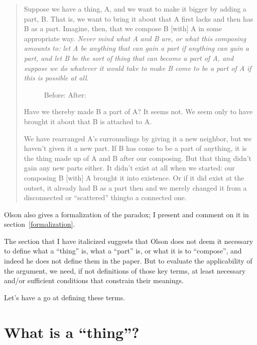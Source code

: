 \documentclass[english,a5paper]{scrartcl}
\newlength{\largeboxwidth}\setlength{\largeboxwidth}{4em}
\begin{document}
\begin{quote}
Suppose we have a thing, A, and we want to make it bigger by adding a part, B. That is, we want to bring it about that A first lacks and then has B as a part. Imagine, then, that we compose B [with] A in some appropriate way. \emph{Never mind what A and B are, or what this composing amounts to: let A be anything that can gain a part if anything can gain a part, and let B be the sort of thing that can become a part of A, and suppose we do whatever it would take to make B come to be a part of A if this is possible at all}.

\begin{figure}[h]
  \centering%
  Before: \hspace{1em}\hspace{5ex}%
  After: %
  \caption{}%
  \label{atomicfigure}
\end{figure}

Have we thereby made B a part of A? It seems not. We seem only to have brought it about that B is attached to A.

We have rearranged A's surroundings by giving it a new neighbor, but we haven't given it a new part. If B has come to be a part of anything, it is the thing made up of A and B after our composing. But that thing didn't gain any new parts either. It didn't exist at all when we started: our composing B [with] A brought it into existence. Or if it did exist at the outset, it already had B as a part then and we merely changed it from a disconnected or “scattered” thing\textelp{}to a connected one.
\end{quote}

Olson also gives a formalization of the paradox; I present and comment on it in section~\ref{formalization}.

The section that I have italicized suggests that Olson does not deem it necessary to define what a “thing” is, what a “part” is, or what it is to “compose”, and indeed he does not define them in the paper. But to evaluate the applicability of the argument, we need, if not definitions of those key terms, at least necessary and/or sufficient conditions that constrain their meanings.

Let’s have a go at defining these terms.

\section{What is a “thing”?}
\end{document}

